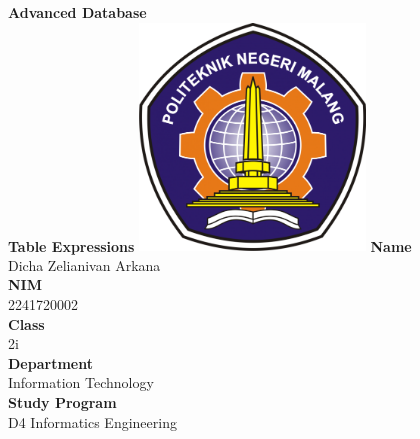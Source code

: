 \documentclass[12pt,titlepage]{article}
\newcommand{\vSubject}{Advanced Database}
\newcommand{\vSubtitle}{Table Expressions}
\newcommand{\vName}{Dicha Zelianivan Arkana}
\newcommand{\vNIM}{2241720002}
\newcommand{\vClass}{2i}
\newcommand{\vDepartment}{Information Technology}
\newcommand{\vStudyProgram}{D4 Informatics Engineering}
\begin{document}
\begin{titlepage}
    \centering
    \vfill
    {\bfseries\LARGE
        \vSubject\\
        \vskip0.25cm
        \vSubtitle
    }
    \vfill
    \includegraphics[width=6cm]{images/polinema-logo.png}
    \vfill
    {
        \textbf{Name}\\
        \vName\\
        \vskip0.5cm
        \textbf{NIM}\\
        \vNIM\\
        \vskip0.5cm
        \textbf{Class}\\
        \vClass\\
        \vskip0.5cm
        \textbf{Department}\\
        \vDepartment\\
        \vskip0.5cm
        \textbf{Study Program}\\
        \vStudyProgram
    }
\end{titlepage}
\end{document}
